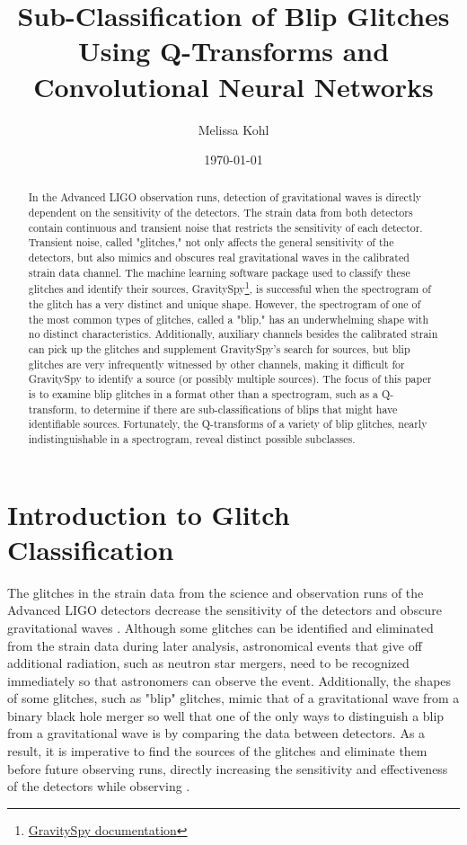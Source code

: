 \documentclass[a4paper]{article}
\title{Sub-Classification of Blip Glitches Using Q-Transforms and Convolutional Neural Networks}
\author{Melissa Kohl}
\date{\today}
\begin{document}
\maketitle
\graphicspath{ {images/} }

\begin{abstract}

In the Advanced LIGO observation runs, detection of gravitational waves is directly dependent on the sensitivity of the detectors. The strain data from both detectors contain continuous and transient noise that restricts the sensitivity of each detector. Transient noise, called "glitches," not only affects the general sensitivity of the detectors, but also mimics and obscures real gravitational waves in the calibrated strain data channel. The machine learning software package used to classify these glitches and identify their sources, GravitySpy\footnote{\href{https://gravity-spy.github.io}{GravitySpy documentation}}, is successful when the spectrogram of the glitch has a very distinct and unique shape. However, the spectrogram of one of the most common types of glitches, called a "blip," has an underwhelming shape with no distinct characteristics. Additionally, auxiliary channels besides the calibrated strain can pick up the glitches and supplement GravitySpy's search for sources, but blip glitches are very infrequently witnessed by other channels, making it difficult for GravitySpy to identify a source (or possibly multiple sources). The focus of this paper is to examine blip glitches in a format other than a spectrogram, such as a Q-transform, to determine if there are sub-classifications of blips that might have identifiable sources. Fortunately, the Q-transforms of a variety of blip glitches, nearly indistinguishable in a spectrogram, reveal distinct possible subclasses.

\end{abstract} 

\section{Introduction to Glitch Classification} \label{introduction}

The glitches in the strain data from the science and observation runs of the Advanced LIGO detectors decrease the sensitivity of the detectors and obscure gravitational waves \cite{Zevin:2016}. Although some glitches can be identified and eliminated from the strain data during later analysis, astronomical events that give off additional radiation, such as neutron star mergers, need to be recognized immediately so that astronomers can observe the event. Additionally, the shapes of some glitches, such as "blip" glitches, mimic that of a gravitational wave from a binary black hole merger so well that one of the only ways to distinguish a blip from a gravitational wave is by comparing the data between detectors. As a result, it is imperative to find the sources of the glitches and eliminate them before future observing runs, directly increasing the sensitivity and effectiveness of the detectors while observing \cite{Mukherjee:2010}. 
\end{document}

